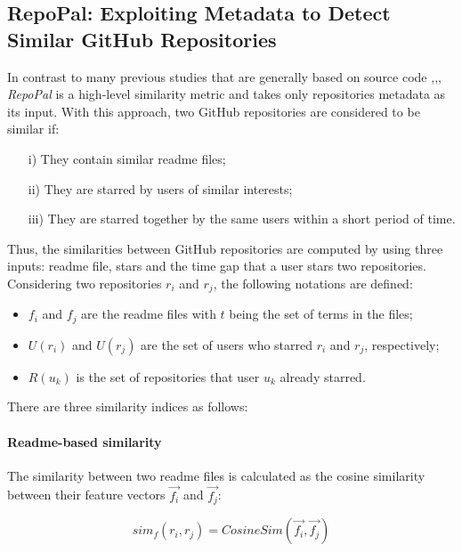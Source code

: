\subsection{RepoPal: Exploiting Metadata to Detect Similar GitHub Repositories}\label{sec:repopal}

In contrast to many previous studies that are generally based on source code \cite{10.1109/APSEC.2004.69},\cite{Liu:2006:GDS:1150402.1150522},\cite{McMillan:2012:DSS:2337223.2337267}, \textit{RepoPal}  \cite{10.1109/SANER.2017.7884605} is a high-level similarity metric and takes only repositories metadata as its input. With this approach, two GitHub repositories are considered to be similar if:

\begin{itemize}
	\item[i)] They contain similar readme files;
	\item[ii)] They are starred by users of similar interests;
	\item[iii)] They are starred together by the same users within a short period of time. 
\end{itemize}

Thus, the similarities between GitHub repositories are computed by using three inputs: readme file, stars and the time gap that a user stars two repositories. Considering two repositories $ r_{i} $ and $ r_{j} $, the following notations are defined: 

\begin{itemize}
	\item $ f_{i} $ and $ f_{j} $ are the readme files with $ t $ being the set of terms in the files; 
	\item $ U(r_{i}) $ and $ U(r_{j}) $ are the set of users who starred $ r_{i} $ and $ r_{j} $, respectively; 
	\item $ R(u_{k}) $ is the set of repositories that user $ u_{k} $ already starred.  
\end{itemize}

There are three similarity indices as follows:

\paragraph{Readme-based similarity} 

The similarity between two readme files is calculated as the cosine similarity between their feature vectors $\vec{f_{i}}$ and $\vec{f_{j}}$: 

\begin{equation}
sim_{f}(r_{i},r_{j})=CosineSim(\vec{f_{i}},\vec{f_{j}})
\end{equation}


